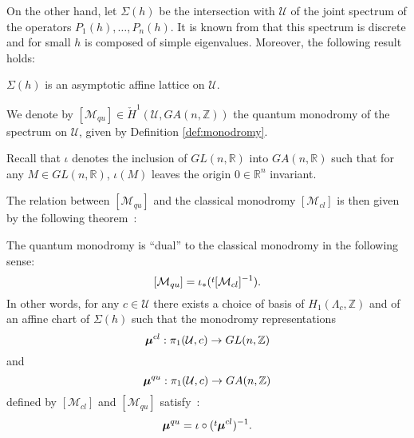 \documentclass[cmp]{svjour}  %
\newcommand{\fleche}{\rightarrow}
\newcommand{\trsp}{\raisebox{.6ex}{${\scriptstyle t}$}}
\newcommand{\RM}{\mathbb{R}}
\newcommand{\ZM}{\mathbb{Z}}
\newcommand{\U}{\mathcal{U}}
\newcommand{\M}{\mathcal{M}}
\newcommand{\bmu}{\mbox{\boldmath{$\mu$}}}
\begin{document}
On the other hand, let $\Sigma(h)$ be the intersection with $\U$
of the joint spectrum of the operators $P_1(h),\dots,P_n(h)$. It is
known from \cite{charbonnel} that this spectrum is discrete and for small $h$
is composed of simple eigenvalues. Moreover, the
following result holds:
\begin{proposition}
$\Sigma(h)$ is an asymptotic affine lattice on $\U$.
\end{proposition}
We denote by $[\M_{qu}]\in \check{H}^1(\U,GA(n,\ZM))$ the quantum
monodromy of the spectrum on $\U$, given by Definition
\ref{def:monodromy}.

Recall that $\iota$ denotes the inclusion of $GL(n,\RM)$ into
$GA(n,\RM)$ such that for any $M\in GL(n,\RM)$, $\iota(M)$ leaves the
origin $0\in\RM^n$ invariant.

The relation between $[\M_{qu}]$ and the classical monodromy
$[\M_{cl}]$ is then given by the following theorem~:
\begin{theorem}
  \label{theo:main}
  The quantum monodromy is ``dual'' to the classical monodromy in the
  following sense:
  \[ [\M_{qu}] = \iota_*(\trsp[\M_{cl}]^{-1}).\]
  In other words, for any $c\in\U$ there exists a choice of
  basis of $H_1(\Lambda_c,\ZM)$ and of an affine chart of
  $\Sigma(h)$ such that the monodromy representations
  \[\bmu^{cl} : \pi_1(\U,c)\fleche GL(n,\ZM) \]
  and
  \[\bmu^{qu} : \pi_1(\U,c)\fleche GA(n,\ZM) \]
defined by $[\M_{cl}]$ and $[\M_{qu}]$ satisfy~:
\[ \bmu^{qu} = \iota\circ(\trsp\bmu^{cl})^{-1}.\]
\end{theorem}
\end{document}
